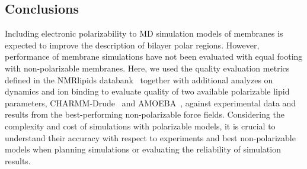 \documentclass[journal=jacsat,manuscript=article,layout=singlecolumn]{achemso}
\begin{document}


\subsection{Conclusions}
Including electronic polarizability to MD simulation models of membranes is expected to improve the description of bilayer polar regions. However, performance of membrane simulations have not been evaluated with equal footing with non-polarizable membranes. Here, we used the quality evaluation metrics defined in the NMRlipids databank~\cite{Databank} together with additional analyzes on dynamics and ion binding to evaluate quality of two available polarizable lipid parameters, CHARMM-Drude~\cite{li2017drude, yu2023drude} and AMOEBA~\cite{chu2018anionicpolarizable,chu2018polarizable}, against
experimental data and results from the best-performing non-polarizable force fields. 
Considering the complexity and cost of simulations with polarizable models, it is crucial to understand their accuracy with respect to experiments and best non-polarizable models when planning simulations or evaluating the reliability of simulation results.
\end{document}
